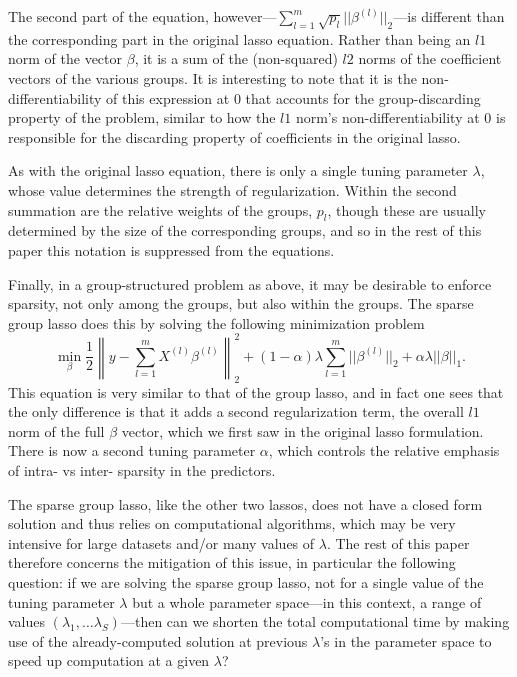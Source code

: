 \documentclass[12pt]{article}
\newcommand{\norm}[1]{\left\lVert #1 \right\rVert}
\begin{document}
The second part of the equation, however---$\sum_{l=1}^m\sqrt{p_l}||\beta^{(l)}||_2$---is different than the corresponding part in the original lasso equation. Rather than being an $l1$ norm of the vector $\beta$, it is a sum of the (non-squared) $l2$ norms of the coefficient vectors of the various groups. It is interesting to note that it is the non-differentiability of this expression at $0$ that accounts for the group-discarding property of the problem, similar to how the $l1$ norm's non-differentiability at 0 is responsible for the discarding property of coefficients in the original lasso. 

As with the original lasso equation, there is only a single tuning parameter $\lambda$, whose value determines the strength of regularization. Within the second summation are the relative weights of the groups, $p_l$, though these are usually determined by the size of the corresponding groups, and so in the rest of this paper this notation is suppressed from the equations.

Finally, in a group-structured problem as above, it may be desirable to enforce sparsity, not only among the groups, but also within the groups. The sparse group lasso \citep{simon2013sparse} does this by solving the following minimization problem
\begin{equation}
  \label{eq:sparsegl}
\min_{\beta}\frac{1}{2}\norm{y-\sum_{l=1}^mX^{(l)}\beta^{(l)}}_2^2 + (1-\alpha)\lambda\sum_{l=1}^m||\beta^{(l)}||_2+\alpha\lambda||\beta||_1.
\end{equation}
This equation is very similar to that of the group lasso, and in fact one sees that the only difference is that it adds a second regularization term, the overall $l1$ norm of the full $\beta$ vector, which we first saw in the original lasso formulation.  There is now a second tuning parameter $\alpha$, which controls the relative emphasis of intra- vs inter- sparsity in the predictors.

The sparse group lasso, like the other two lassos, does not have a closed form solution and thus relies on computational algorithms, which may be very intensive for large datasets and/or many values of $\lambda$. The rest of this paper therefore concerns the mitigation of this issue, in particular the following question: if we are solving the sparse group lasso, not for a single value of the tuning parameter $\lambda$ but a whole parameter space---in this context, a range of values $(\lambda_1,\dots \lambda_S)$---then can we shorten the total computational time by making use of the already-computed solution at previous $\lambda$'s in the parameter space to speed up computation at a given $\lambda$?
\end{document}
